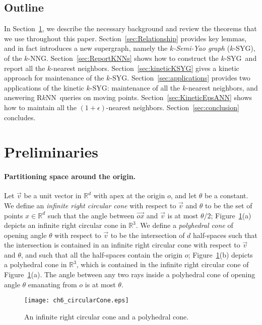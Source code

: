 \documentclass[preprint,12pt]{elsarticle}
\def\rknn{\mbox{R$k$NN}}
\def\knng{\mbox{$k$-NNG}}
\def\ksyg{\mbox{$k$-SYG}}
\begin{document}
\subsection{Outline}\label{sec:Outline} 
In Section~\ref{sec:Preliminaries}, we describe the necessary background and review the theorems that we use throughout this paper. Section~\ref{sec:Relationship} provides key lemmas, and in fact introduces a new supergraph, namely the \textit{$k$-Semi-Yao graph} (\ksyg), of the \knng. Section~\ref{sec:ReportKNNs} shows how to construct the \ksyg~and report all the $k$-nearest neighbors. Section~\ref{sec:kineticKSYG} gives a kinetic approach for maintenance of the $\ksyg$. Section~\ref{sec:applications}  provides two applications of the kinetic $\ksyg$: maintenance of all the $k$-nearest neighbors, and answering \rknn~queries on moving points. Section~\ref{sec:KineticEpsANN} shows how to maintain all the $(1+\epsilon)$-nearest neighbors. Section~\ref{sec:conclusion} concludes.

\section{Preliminaries}\label{sec:Preliminaries}
\paragraph{Partitioning space around the origin.}
Let $\overrightarrow{v}$ be a unit vector in $\mathbb{R}^d$ with apex at the origin $o$, and let $\theta$ be a constant. We define an \textit{infinite right circular cone} with respect to $\overrightarrow{v}$ and $\theta$ to be the set of points $x\in \mathbb{R}^d$ such that the angle between $\overrightarrow{ox}$ and $\overrightarrow{v}$ is at most $\theta/2$; Figure~\ref{fig:circularCone}(a) depicts an infinite right circular cone in $\mathbb{R}^3$. We define a \textit{polyhedral cone} of opening angle $\theta$ with respect to $\overrightarrow{v}$ to be the intersection of $d$ half-spaces such that the intersection is contained in an infinite right circular cone with respect to $\overrightarrow{v}$ and $\theta$, and such that all the half-spaces contain the origin $o$; Figure~\ref{fig:circularCone}(b) depicts a polyhedral cone in $\mathbb{R}^3$, which is contained in the infinite right circular cone of Figure~\ref{fig:circularCone}(a). The angle between any two rays inside a polyhedral cone of opening angle $\theta$ emanating from $o$ is at most $\theta$.

\begin{figure}[t!]
\centering
\texttt{[image: ch6\_circularCone.eps]}
\caption{An infinite right circular cone and a polyhedral cone.}
\label{fig:circularCone}
\end{figure}
\end{document}
